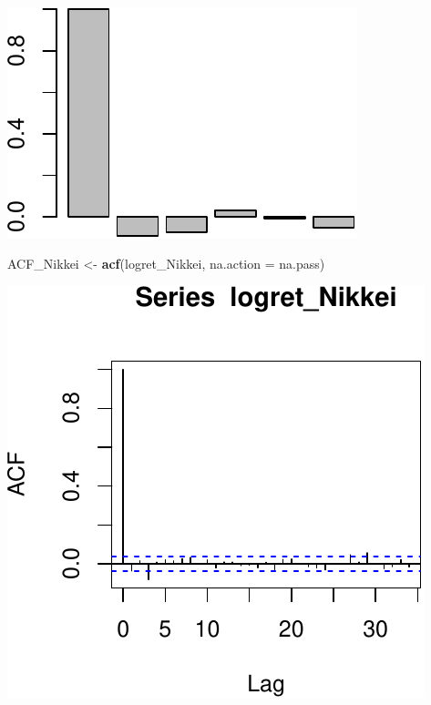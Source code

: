 \documentclass[11pt,]{article}
\newenvironment{Shaded}{\begin{snugshade}}{\end{snugshade}}
\newcommand{\KeywordTok}[1]{\textcolor[rgb]{0.13,0.29,0.53}{\textbf{#1}}}
\newcommand{\DataTypeTok}[1]{\textcolor[rgb]{0.13,0.29,0.53}{#1}}
\newcommand{\StringTok}[1]{\textcolor[rgb]{0.31,0.60,0.02}{#1}}
\newcommand{\OperatorTok}[1]{\textcolor[rgb]{0.81,0.36,0.00}{\textbf{#1}}}
\newcommand{\NormalTok}[1]{#1}
\begin{document}
\begin{Shaded}
\end{Shaded}

\begin{center}\includegraphics{FMC_T4_PhD_ARMA_GARCH_files/figure-latex/sample_ACF_logret-4} \end{center}

\begin{Shaded}
\begin{Highlighting}[]
\NormalTok{ACF_Nikkei <-}\StringTok{ }\KeywordTok{acf}\NormalTok{(logret_Nikkei, }\DataTypeTok{na.action =}\NormalTok{ na.pass)}
\end{Highlighting}
\end{Shaded}

\begin{center}\includegraphics{FMC_T4_PhD_ARMA_GARCH_files/figure-latex/sample_ACF_logret-5} \end{center}
\end{document}
